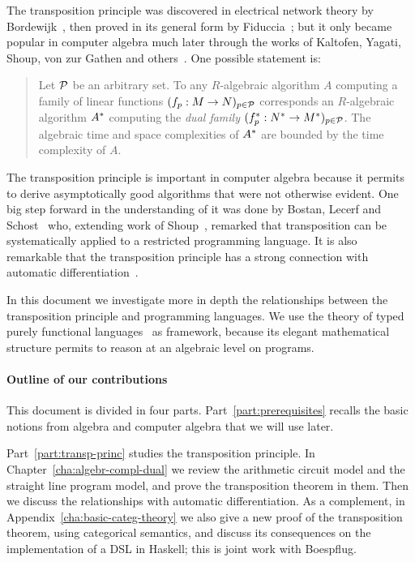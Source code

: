 The transposition principle was discovered in electrical network
theory by Bordewijk~\cite{bordewijk57}, then proved in its general
form by Fiduccia~\cite{fiduccia:phd}; but it only became popular in
computer algebra much later through the works of Kaltofen, Yagati,
Shoup, von zur Gathen and
others~\cite{kaltofen+lakshman89,vzgathen+shoup92,shoup94,shoup95,shoup99,hanrot+quercia+zimmermann}. One
possible statement is:
\begin{quote}
  Let $\mathcal{P}$ be an arbitrary set. To any $R$-algebraic algorithm
  $A$ computing a family of linear functions $(f_p:M\rightarrow
  N)_{p\in\mathcal{P}}$ corresponds an $R$-algebraic algorithm $A^\ast$
  computing the \emph{dual family}
  $(f^\ast_p:N^\ast\rightarrow M^\ast)_{p\in\mathcal{P}}$. The algebraic time
  and space complexities of $A^\ast$ are bounded by the time
  complexity of $A$.
\end{quote}

The transposition principle is important in computer algebra because
it permits to derive asymptotically good algorithms that were not
otherwise evident. One big step forward in the understanding of it was
done by Bostan, Lecerf and Schost~\cite{bostan+lecerf+schost:tellegen}
who, extending work of Shoup~\cite{shoup95}, remarked that
transposition can be systematically applied to a restricted
programming language. It is also remarkable that the transposition
principle has a strong connection with automatic
differentiation~\cite{baur+strassen83,kaltofen+lakshman89,Ka2K,gashkov+gashkov05,sergeev08}.

In this document we investigate more in depth the relationships
between the transposition principle and programming languages. We use
the theory of typed purely functional languages~\cite{pierce} as
framework, because its elegant mathematical structure permits to
reason at an algebraic level on programs.


\paragraph*{Outline of our contributions}
This document is divided in four parts. Part~\ref{part:prerequisites}
recalls the basic notions from algebra and computer algebra that we
will use later.

Part~\ref{part:transp-princ} studies the transposition principle. In
Chapter~\ref{cha:algebr-compl-dual} we review the arithmetic circuit
model and the straight line program model, and prove the transposition
theorem in them. Then we discuss the relationships with automatic
differentiation. As a complement, in
Appendix~\ref{cha:basic-categ-theory} we also give a new proof of the
transposition theorem, using categorical semantics, and discuss its
consequences on the implementation of a DSL in Haskell; this is joint
work with Boespflug.

